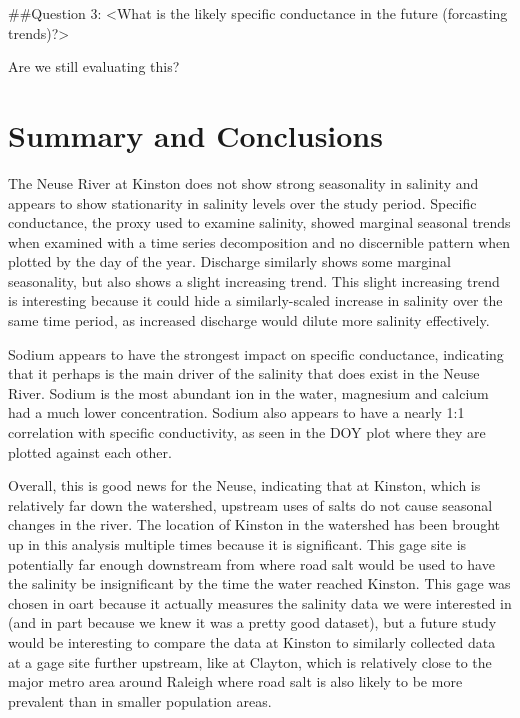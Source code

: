 \documentclass[
  12pt,
]{article}
\begin{document}
\#\#Question 3: \textless What is the likely specific conductance in the
future (forcasting trends)?\textgreater{}

Are we still evaluating this?

\newpage

\hypertarget{summary-and-conclusions}{%
\section{Summary and Conclusions}\label{summary-and-conclusions}}

The Neuse River at Kinston does not show strong seasonality in salinity
and appears to show stationarity in salinity levels over the study
period. Specific conductance, the proxy used to examine salinity, showed
marginal seasonal trends when examined with a time series decomposition
and no discernible pattern when plotted by the day of the year.
Discharge similarly shows some marginal seasonality, but also shows a
slight increasing trend. This slight increasing trend is interesting
because it could hide a similarly-scaled increase in salinity over the
same time period, as increased discharge would dilute more salinity
effectively.

Sodium appears to have the strongest impact on specific conductance,
indicating that it perhaps is the main driver of the salinity that does
exist in the Neuse River. Sodium is the most abundant ion in the water,
magnesium and calcium had a much lower concentration. Sodium also
appears to have a nearly 1:1 correlation with specific conductivity, as
seen in the DOY plot where they are plotted against each other.

Overall, this is good news for the Neuse, indicating that at Kinston,
which is relatively far down the watershed, upstream uses of salts do
not cause seasonal changes in the river. The location of Kinston in the
watershed has been brought up in this analysis multiple times because it
is significant. This gage site is potentially far enough downstream from
where road salt would be used to have the salinity be insignificant by
the time the water reached Kinston. This gage was chosen in oart because
it actually measures the salinity data we were interested in (and in
part because we knew it was a pretty good dataset), but a future study
would be interesting to compare the data at Kinston to similarly
collected data at a gage site further upstream, like at Clayton, which
is relatively close to the major metro area around Raleigh where road
salt is also likely to be more prevalent than in smaller population
areas.
\end{document}
